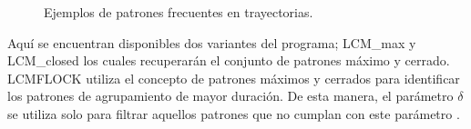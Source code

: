 \begin{figure}
  \centering
  \caption{Ejemplos de patrones frecuentes en trayectorias.}
  \label{fig:transactionTrajectory}
\end{figure}

 Aquí se encuentran disponibles dos variantes del programa; LCM\_max y LCM\_closed los cuales 
recuperarán el conjunto de patrones máximo y cerrado\cite{han2000mining}.  LCMFLOCK utiliza el 
concepto de patrones máximos y cerrados para identificar los patrones de agrupamiento de mayor 
duración.  De esta manera, el parámetro $\delta$ se utiliza solo para filtrar aquellos patrones que 
no cumplan con este parámetro \cite{romero2011mining}.
 
